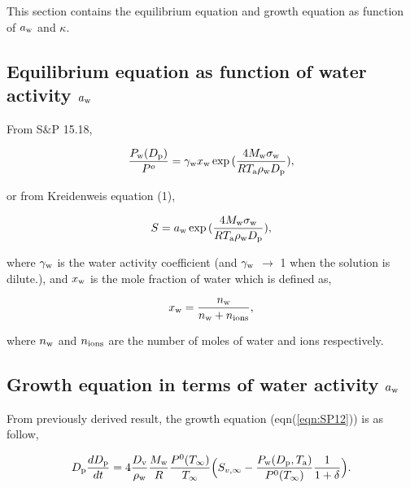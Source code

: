 \documentclass[12pt]{article}
\begin{document}
This section contains the equilibrium equation and growth equation as function of $a_{\rm w}$ and $\kappa$. 

 
\subsection{Equilibrium equation as function of water activity $a_{\rm w}$}

From S$\&$P 15.18, 

\begin{equation}\label{eqn:8}
\frac{P_{\rm w}(D_{\rm p})}{P^{o}}=\gamma_{\rm w}x_{\rm w}\exp{(\frac{4 M_{\rm w} \sigma_{\rm w}}{R T_{\rm a} \rho_{\rm w} D_{\rm p}})},
\end{equation}

or from Kreidenweis equation (1),

\begin{equation}\label{eqn:9}
S=a_{\rm w}\exp{(\frac{4 M_{\rm w} \sigma_{\rm w}}{R T_{\rm a} \rho_{\rm w}D_{\rm p}})}, 
\end{equation}

where $\gamma_{\rm w}$ is the water activity coefficient (and $\gamma_{\rm w}$ $\rightarrow$ 1 when the solution is dilute.), and $x_{\rm w}$ is the mole fraction of water which is defined as,

\begin{equation}\label{eqn:10}
x_{\rm w}=\frac{n_{\rm w}}{n_{\rm w}+n_{\rm ions}},
\end{equation}

where $n_{\rm w}$ and $n_{\rm ions}$ are the number of moles of water and ions respectively.


\subsection{Growth equation in terms of water activity $a_{\rm w}$}

From previously derived result, the growth equation (eqn(\ref{eqn:SP12})) is as follow,

\begin{equation}\label{eqn:11}
D_{\rm p}\frac{dD_{\rm p}}{dt}=4 \frac{D_{\rm v}} {\rho_{\rm w}} \frac{M_{\rm w}}{R} \frac{P^{\rm 0}(T_{\infty})} {T_{\infty}} \Big(S_{v, \infty} - \frac{P_{\rm w}(D_{\rm p}, T_{\rm a})}{P^{\rm 0}(T_{\infty})} \frac{1}{1+\delta}\Big).
\end{equation}
\end{document}
